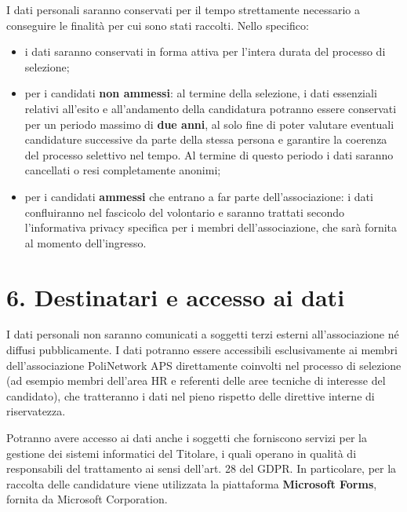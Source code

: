 \documentclass[11pt, a4paper]{article}
\begin{document}
I dati personali saranno conservati per il tempo strettamente necessario a conseguire le finalità per cui sono stati raccolti. Nello specifico:
\begin{itemize}
    \item i dati saranno conservati in forma attiva per l'intera durata del processo di selezione;
    \item per i candidati \textbf{non ammessi}: al termine della selezione, i dati essenziali relativi all'esito e all'andamento della candidatura potranno essere conservati per un periodo massimo di \textbf{due anni}, al solo fine di poter valutare eventuali candidature successive da parte della stessa persona e garantire la coerenza del processo selettivo nel tempo. Al termine di questo periodo i dati saranno cancellati o resi completamente anonimi;
    \item per i candidati \textbf{ammessi} che entrano a far parte dell'associazione: i dati confluiranno nel fascicolo del volontario e saranno trattati secondo l'informativa privacy specifica per i membri dell'associazione, che sarà fornita al momento dell'ingresso.
\end{itemize}

\section*{6. Destinatari e accesso ai dati}

I dati personali non saranno comunicati a soggetti terzi esterni all'associazione né diffusi pubblicamente. I dati potranno essere accessibili esclusivamente ai membri dell'associazione PoliNetwork APS direttamente coinvolti nel processo di selezione (ad esempio membri dell'area HR e referenti delle aree tecniche di interesse del candidato), che tratteranno i dati nel pieno rispetto delle direttive interne di riservatezza.

Potranno avere accesso ai dati anche i soggetti che forniscono servizi per la gestione dei sistemi informatici del Titolare, i quali operano in qualità di responsabili del trattamento ai sensi dell'art. 28 del GDPR. In particolare, per la raccolta delle candidature viene utilizzata la piattaforma \textbf{Microsoft Forms}, fornita da Microsoft Corporation.
\end{document}
